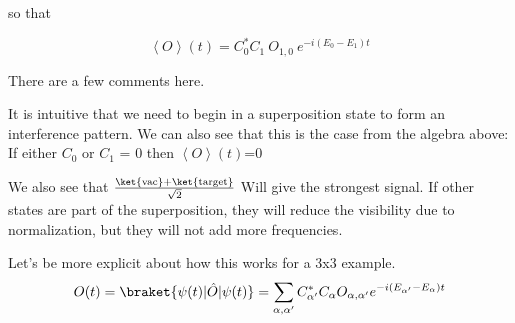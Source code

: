 {so that

\begin{equation}
    \left< O \right>(t) = C^{*}_{0}C_{1} \: O_{1,0} \: e^{- i(E_{0} - E_{1} )t}
\end{equation}

There are a few comments here.

It is intuitive that we need to begin in a superposition state to form an interference pattern.
We can also see that this is the case from the algebra above:  If either $C_0$ or $C_1$ = 0 then $\left< O \right>(t)$=0

We also see that $\frac{ \ket{\text{vac}} + \ket{\text{target}} }{\sqrt{2}}$ Will give the strongest signal.
If other states are part of the superposition, they will reduce the visibility due to normalization, but they will not add more frequencies.

Let's be more explicit about how this works for a 3x3 example.
\begin{equation*}
    \begin{aligned}
        O(t) =\braket{\psi(t)|\hat{O}|\psi(t)} = \sum_{\alpha, \alpha^{\prime}} C^{*}_{\alpha^{\prime}} C_{\alpha} O_{\alpha, \alpha^{\prime}} e^{- i (E_{\alpha^{\prime}} - E_{\alpha}) t}   \\[2.0ex]
    \end{aligned}
\end{equation*}

}

